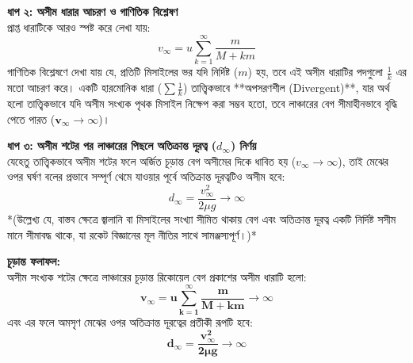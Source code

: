 \documentclass[12pt, a4paper]{article}
\begin{document}
\begin{tcolorbox}[solutionbox={সমাধান (Solution)}]
\begin{center}
\end{center}
\vspace{1em}

\noindent
\textbf{ধাপ ২: অসীম ধারার আচরণ ও গাণিতিক বিশ্লেষণ} \\
প্রাপ্ত ধারাটিকে আরও স্পষ্ট করে লেখা যায়:
\[ v_\infty = u \sum_{k=1}^{\infty} \frac{m}{M + km} \]
গাণিতিক বিশ্লেষণে দেখা যায় যে, প্রতিটি মিসাইলের ভর যদি নির্দিষ্ট ($m$) হয়, তবে এই অসীম ধারাটির পদগুলো $\frac{1}{k}$ এর মতো আচরণ করে। একটি হারমোনিক ধারা ($\sum \frac{1}{k}$) তাত্ত্বিকভাবে **অপসরণশীল (Divergent)**, যার অর্থ হলো তাত্ত্বিকভাবে যদি অসীম সংখ্যক পৃথক মিসাইল নিক্ষেপ করা সম্ভব হতো, তবে লাঞ্চারের বেগ সীমাহীনভাবে বৃদ্ধি পেতে পারত ($\mathbf{v_\infty \to \infty}$)। 

\vspace{0.5em}
\noindent
\textbf{ধাপ ৩: অসীম শটের পর লাঞ্চারের পিছলে অতিক্রান্ত দূরত্ব ($d_\infty$) নির্ণয়} \\
যেহেতু তাত্ত্বিকভাবে অসীম শটের ফলে অর্জিত চূড়ান্ত বেগ অসীমের দিকে ধাবিত হয় ($v_\infty \to \infty$), তাই মেঝের ওপর ঘর্ষণ বলের প্রভাবে সম্পূর্ণ থেমে যাওয়ার পূর্বে অতিক্রান্ত দূরত্বটিও অসীম হবে:
\[ d_\infty = \frac{v_\infty^2}{2\mu g} \to \infty \]
*(উল্লেখ্য যে, বাস্তব ক্ষেত্রে জ্বালানি বা মিসাইলের সংখ্যা সীমিত থাকায় বেগ এবং অতিক্রান্ত দূরত্ব একটি নির্দিষ্ট সসীম মানে সীমাবদ্ধ থাকে, যা রকেট বিজ্ঞানের মূল নীতির সাথে সামঞ্জস্যপূর্ণ।)*

\vspace{1em}
\begin{tcolorbox}[answerbox]
\textbf{চূড়ান্ত ফলাফল:} \\
অসীম সংখ্যক শটের ক্ষেত্রে লাঞ্চারের চূড়ান্ত রিকোয়েল বেগ প্রকাশের অসীম ধারাটি হলো:
\[ \mathbf{v_\infty = u \sum_{k=1}^{\infty} \frac{m}{M + km} \to \infty} \]
এবং এর ফলে অমসৃণ মেঝের ওপর অতিক্রান্ত দূরত্বের প্রতীকী রূপটি হবে:
\[ \mathbf{d_\infty = \frac{v_\infty^2}{2\mu g} \to \infty} \]
\end{tcolorbox}
\end{tcolorbox}
\end{document}
